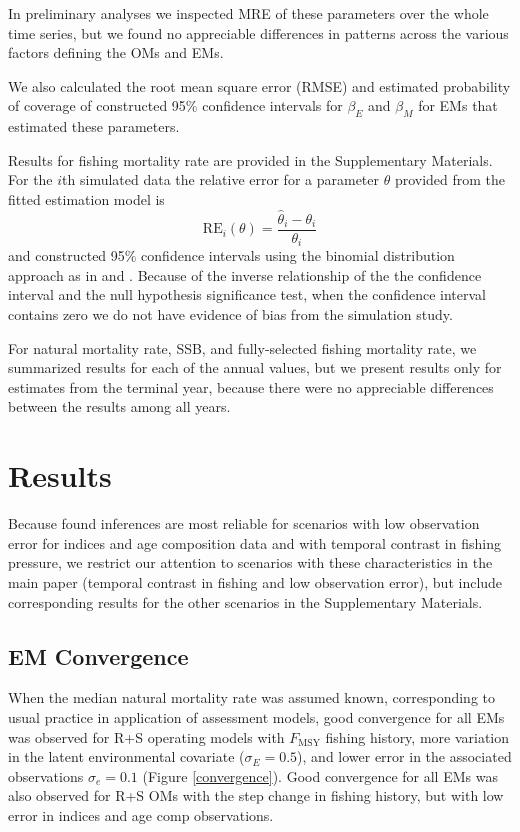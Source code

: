 \documentclass[
  12pt,
]{article}
\newcommand{\Fmsy}{\ensuremath{F_{\text{MSY}}}\xspace}
\begin{document}
In preliminary analyses we inspected MRE of these parameters over the whole time series, but we found no appreciable differences in patterns across the various factors defining the OMs and EMs.

We also calculated the root mean square error (RMSE) and estimated probability of coverage of constructed 95\% confidence intervals for \(\beta_E\) and \(\beta_M\) for EMs that estimated these parameters.

Results for fishing mortality rate are provided in the Supplementary Materials. For the \(i\)th simulated data the relative error for a parameter \(\theta\) provided from the fitted estimation model is
\[
{\text{RE}_i}\left(\theta\right) = \frac{\widehat \theta_i - \theta_i}{\theta_i}
\]
and constructed 95\% confidence intervals using the binomial distribution approach as in \citet{stockmiller21} and \citet{milleretal_inreview1}. Because of the inverse relationship of the the confidence interval and the null hypothesis significance test, when the confidence interval contains zero we do not have evidence of bias from the simulation study.

For natural mortality rate, SSB, and fully-selected fishing mortality rate, we summarized results for each of the annual values, but we present results only for estimates from the terminal year, because there were no appreciable differences between the results among all years.

\hypertarget{results}{%
\section*{Results}\label{results}}

Because \citet{milleretal_inreview1} found inferences are most reliable for scenarios with low observation error for indices and age composition data and with temporal contrast in fishing pressure, we restrict our attention to scenarios with these characteristics in the main paper (temporal contrast in fishing and low observation error), but include corresponding results for the other scenarios in the Supplementary Materials.

\hypertarget{em-convergence-1}{%
\subsection*{EM Convergence}\label{em-convergence-1}}

When the median natural mortality rate was assumed known, corresponding to usual practice in application of assessment models, good convergence for all EMs was observed for R+S operating models with \Fmsy fishing history, more variation in the latent environmental covariate (\(\sigma_E = 0.5\)), and lower error in the associated observations \(\sigma_e = 0.1\) (Figure \ref{convergence}). Good convergence for all EMs was also observed for R+S OMs with the step change in fishing history, but with low error in indices and age comp observations.
\end{document}
